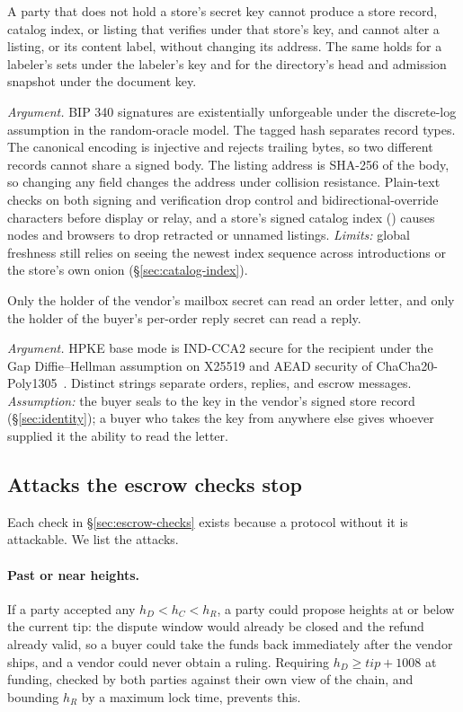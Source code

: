 \begin{property}
A party that does not hold a store's secret key cannot produce a store record, catalog index, or listing that verifies under that store's key, and cannot alter a listing, or its content label, without changing its address. The same holds for a labeler's sets under the labeler's key and for the directory's head and admission snapshot under the document key.
\end{property}
\noindent\emph{Argument.} BIP 340 signatures are existentially unforgeable under the discrete-log assumption in the random-oracle model. The tagged hash separates record types. The canonical encoding is injective and rejects trailing bytes, so two different records cannot share a signed body. The listing address is SHA-256 of the body, so changing any field changes the address under collision resistance. Plain-text checks on both signing and verification drop control and bidirectional-override characters before display or relay, and a store's signed catalog index () causes nodes and browsers to drop retracted or unnamed listings. \emph{Limits:} global freshness still relies on seeing the newest index sequence across introductions or the store's own onion (\S\ref{sec:catalog-index}).

\begin{property}
Only the holder of the vendor's mailbox secret can read an order letter, and only the holder of the buyer's per-order reply secret can read a reply.
\end{property}
\noindent\emph{Argument.} HPKE base mode is IND-CCA2 secure for the recipient under the Gap Diffie--Hellman assumption on X25519 and AEAD security of ChaCha20-Poly1305~\citep{rfc9180}. Distinct  strings separate orders, replies, and escrow messages. \emph{Assumption:} the buyer seals to the key in the vendor's signed store record (\S\ref{sec:identity}); a buyer who takes the key from anywhere else gives whoever supplied it the ability to read the letter.

\subsection{Attacks the escrow checks stop}
\label{sec:attacks}

Each check in \S\ref{sec:escrow-checks} exists because a protocol without it is attackable. We list the attacks.

\paragraph{Past or near heights.} If a party accepted any $h_D<h_C<h_R$, a party could propose heights at or below the current tip: the dispute window would already be closed and the refund already valid, so a buyer could take the funds back immediately after the vendor ships, and a vendor could never obtain a ruling. Requiring $h_D \ge \mathit{tip}+1008$ at funding, checked by both parties against their own view of the chain, and bounding $h_R$ by a maximum lock time, prevents this.

